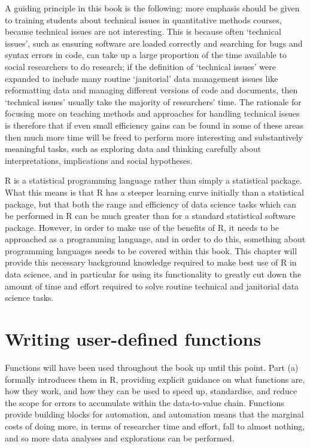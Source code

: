 \documentclass[]{book}
\theoremstyle{definition}
\theoremstyle{definition}
\theoremstyle{definition}
\theoremstyle{remark}
\begin{document}
A guiding principle in this book is the following: more emphasis should
be given to training students about technical issues in quantitative
methods courses, because technical issues are not interesting. This is
because often `technical issues', such as ensuring software are loaded
correctly and searching for bugs and syntax errors in code, can take up
a large proportion of the time available to social researchers to do
research; if the definition of `technical issues' were expanded to
include many routine `janitorial' data management issues like
reformatting data and managing different versions of code and documents,
then `technical issues' usually take the majority of researchers' time.
The rationale for focusing more on teaching methods and approaches for
handling technical issues is therefore that if even small efficiency
gains can be found in some of these areas then much more time will be
freed to perform more interesting and substantively meaningful tasks,
such as exploring data and thinking carefully about interpretations,
implications and social hypotheses.

R is a statistical programming language rather than simply a statistical
package. What this means is that R has a steeper learning curve
initially than a statistical package, but that both the range and
efficiency of data science tasks which can be performed in R can be much
greater than for a standard statistical software package. However, in
order to make use of the benefits of R, it needs to be approached as a
programming language, and in order to do this, something about
programming languages needs to be covered within this book. This chapter
will provide this necessary background knowledge required to make best
use of R in data science, and in particular for using its functionality
to greatly cut down the amount of time and effort required to solve
routine technical and janitorial data science tasks.

\section{Writing user-defined
functions}\label{writing-user-defined-functions}

Functions will have been used throughout the book up until this point.
Part (a) formally introduces them in R, providing explicit guidance on
what functions are, how they work, and how they can be used to speed up,
standardise, and reduce the scope for errors to accumulate within the
data-to-value chain. Functions provide building blocks for automation,
and automation means that the marginal costs of doing more, in terms of
researcher time and effort, fall to almost nothing, and so more data
analyses and explorations can be performed.
\end{document}
